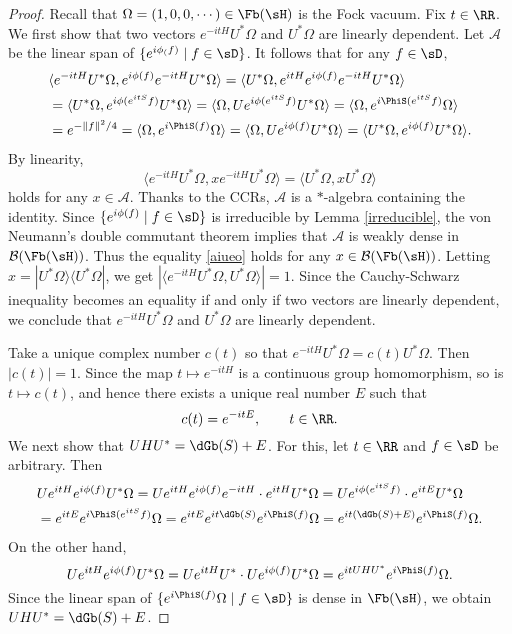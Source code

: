 \documentclass[12pt,draft]{article}
\theoremstyle{plain}
\numberwithin{equation}{section}
\theoremstyle{remark}
\begin{document}
\begin{proof}
Recall that $\Omega=(1,0,0,\cdots)\in\Fb(\sH)$ is the Fock vacuum.
Fix $t\in\RR$.
We first show that two vectors $e^{-itH}U^*\Omega$ and $U^*\Omega$ are linearly dependent.
Let $\mathcal{A}$ be the linear span of $\{e^{i\phi_(f)} \mid f\in\sD\}$.
It follows that for any $f\in\sD$,
\begin{align*}
 &\langle e^{-itH}U^*\Omega,e^{i\phi(f)}e^{-itH}U^*\Omega\rangle 
  = \langle U^*\Omega,e^{itH}e^{i\phi(f)}e^{-itH}U^*\Omega\rangle\\ 
   &= \langle U^*\Omega,e^{i\phi(e^{itS}f)}U^*\Omega\rangle
= \langle \Omega,Ue^{i\phi(e^{itS}f)}U^*\Omega\rangle = \langle \Omega,e^{i\PhiS(e^{itS}f)}\Omega\rangle \\
&= e^{-\|f\|^2/4}= \langle \Omega,e^{i\PhiS(f)}\Omega\rangle = \langle \Omega,Ue^{i\phi(f)}U^*\Omega\rangle =  \langle U^*\Omega,e^{i\phi(f)}U^*\Omega\rangle.
\end{align*}
By linearity,
\begin{equation}\label{aiueo}
\langle e^{-itH}U^*\Omega,xe^{-itH}U^*\Omega\rangle = \langle U^*\Omega,xU^*\Omega\rangle
\end{equation}
holds for any $x\in \mathcal{A}$.
Thanks to the CCRs, $\mathcal{A}$ is a $*$-algebra containing the identity.
Since $\{e^{i\phi(f)} \mid f\in \sD\}$ is irreducible by Lemma \ref{irreducible}, 
the von Neumann's double commutant theorem implies that
$\mathcal{A}$ is weakly dense in $\mathcal{B}(\Fb(\sH))$.
Thus the equality \eqref{aiueo} holds for any $x\in\mathcal{B}(\Fb(\sH))$.
Letting $x=|U^*\Omega\rangle\langle U^*\Omega|$, we get $|\langle e^{-itH}U^*\Omega,U^*\Omega\rangle|=1$.
Since the Cauchy-Schwarz inequality becomes an equality if and only if two vectors are linearly dependent,
we conclude that $e^{-itH}U^*\Omega$ and $U^*\Omega$ are linearly dependent.

Take a unique complex number $c(t)$ so that $e^{-itH}U^*\Omega=c(t)U^*\Omega$.
Then $|c(t)|=1$.
Since the map $t\mapsto e^{-itH}$ is a continuous group homomorphism, so is $t\mapsto c(t)$, 
and hence there exists a unique real number $E$ such that 
\[
c(t)=e^{-itE}, \qquad  t\in\RR.
\]
We next show that $UHU^*= \dGb(S)+E$.
For this, let $t\in\RR$ and $f\in\sD$ be arbitrary.
Then
\begin{align*}
&Ue^{itH}e^{i\phi(f)}U^*\Omega 
 = Ue^{itH}e^{i\phi(f)}e^{-itH}\cdot e^{itH}U^*\Omega
  = Ue^{i\phi(e^{itS}f)}\cdot e^{itE}U^*\Omega\\
&=e^{itE}e^{i\PhiS(e^{itS}f)}\Omega = e^{itE}e^{it\dGb(S)}e^{i\PhiS(f)}\Omega
  = e^{it(\dGb(S)+E)}e^{i\PhiS(f)}\Omega.
\end{align*}
On the other hand, 
\[
Ue^{itH}e^{i\phi(f)}U^*\Omega = Ue^{itH}U^*\cdot Ue^{i\phi(f)}U^*\Omega = e^{itUHU^*}e^{i\PhiS(f)}\Omega.
\]
Since the linear span of $\{e^{i\PhiS(f)}\Omega \mid f\in\sD\}$ is dense in $\Fb(\sH)$,
we obtain $UHU^*= \dGb(S)+E$.
\end{proof}
\end{document}
